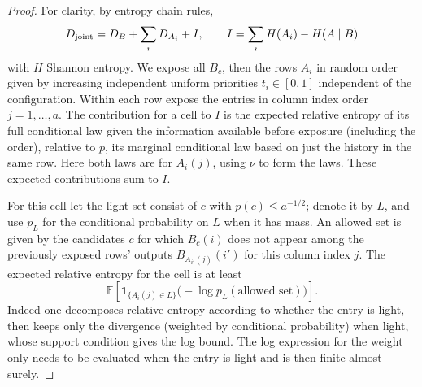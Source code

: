\begin{proof}\label{tra:projection-deletion:entropy-proof}
\label{tra:projection-deletion:light-atoms-and-exceptional-counts}
For clarity, by entropy chain rules,
\begin{equation}
D_{\rm joint}=D_B+\sum_i D_{A_i}+I,\qquad
I=\sum_i H(A_i)-H(A\mid B)
\label{tra:projection-deletion:eq10}
\end{equation}
with \(H\) Shannon entropy. We expose all \(B_c\), then the rows \(A_i\) in random order given by increasing independent uniform priorities \(t_i\in[0,1]\) independent of the configuration. Within each row expose the entries in column index order \(j=1,\ldots,a\). The contribution for a cell to \(I\) is the expected relative entropy of its full conditional law given the information available before exposure (including the order), relative to \(p\), its marginal conditional law based on just the history in the same row. Here both laws are for \(A_i(j)\), using \(\nu\) to form the laws. These expected contributions sum to \(I\).

For this cell let the light set consist of \(c\) with \(p(c)\le a^{-1/2}\); denote it by \(L\), and use \(p_L\) for the conditional probability on \(L\) when it has mass. An allowed set is given by the candidates \(c\) for which \(B_c(i)\) does not appear among the previously exposed rows' outputs \(B_{A_{i'}(j)}(i')\) for this column index \(j\). The expected relative entropy for the cell is at least
\begin{equation}
\mathbb E\left[\mathbf 1_{\{A_i(j)\in L\}}\big(-\log p_L(\text{allowed set})\big)\right].
\label{tra:projection-deletion:eq11}
\end{equation}
Indeed one decomposes relative entropy according to whether the entry is light, then keeps only the divergence (weighted by conditional probability) when light, whose support condition gives the log bound. The log expression for the weight only needs to be evaluated when the entry is light and is then finite almost surely.


\end{proof}
